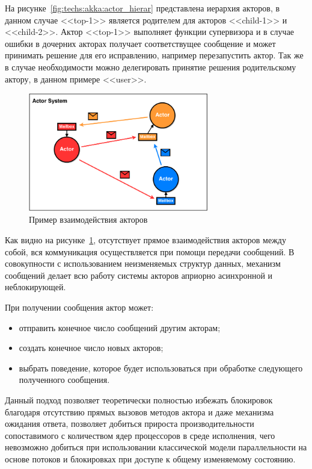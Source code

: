 На рисунке~\ref{fig:techs:akka:actor_hierar} представлена иерархия акторов, в данном случае <<top-1>> является родителем для акторов <<child-1>> и <<child-2>>. Актор <<top-1>> выполняет функции супервизора и в случае ошибки в дочерних акторах получает соответствущее сообщение и может принимать решение для его исправлению, например перезапустить актор. Так же в случае необходимости можно делегировать принятие решения родительскому актору, в данном примере <<user>>.
\begin{figure}[ht]
    \centering
    \includegraphics[width=0.7\textwidth]{figures/actor_model.png}
    \caption{Пример взаимодействия акторов}
    \label{fig:techs:akka:actor_model:comulication}
\end{figure}

Как видно на рисунке~\ref{fig:techs:akka:actor_model:comulication}, отсутствует прямое взаимодействия акторов между собой, вся коммуникация осуществляется при помощи передачи сообщений. В совокупности с использованием неизменяемых структур данных, механизм сообщений делает всю работу системы акторов априорно асинхронной и неблокирующей.

При получении сообщения актор может:
\begin{itemize}
  \item отправить конечное число сообщений другим акторам;
  \item создать конечное число новых акторов;
  \item выбрать поведение, которое будет использоваться при обработке следующего полученного сообщения.
\end{itemize}

Данный подход позволяет теоретически полностью избежать блокировок благодаря отсутствию прямых вызовов методов актора и даже механизма ожидания ответа, позволяет добиться прироста производительности сопоставимого с количеством ядер процессоров в среде исполнения, чего невозможно добиться при использовании классической модели параллельности на основе потоков и блокировках при доступе к общему изменяемому состоянию.

